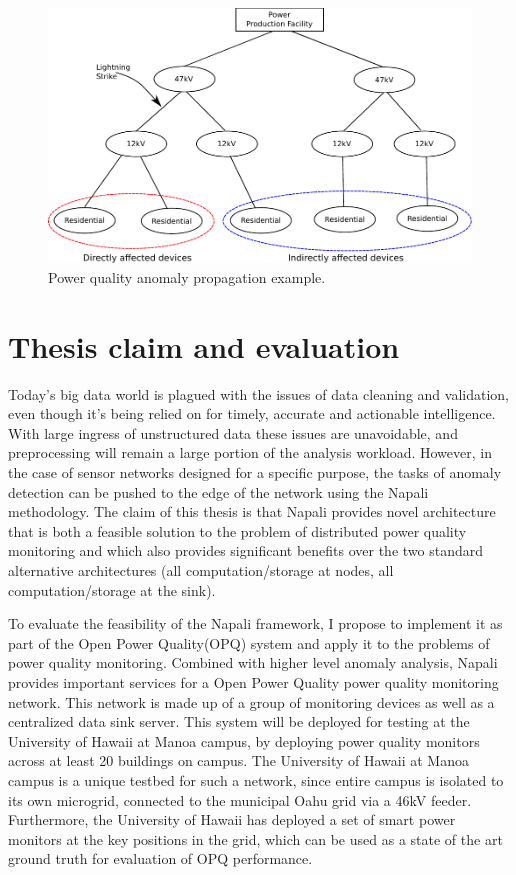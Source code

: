 \begin{figure}[h]
	\centering
	  \includegraphics[width=0.9\linewidth]{img/grid_hierarchy_cartoon.pdf}
	  \caption{Power quality anomaly propagation example.}
	  \label{intro:fig2}
\end{figure}

\section{Thesis claim and evaluation} \label{intro:sec:claim}

Today's big data world is plagued with the issues of data cleaning and validation, even though it's being relied on for timely, accurate and actionable intelligence. With large ingress of unstructured data these issues are unavoidable, and preprocessing will remain a large portion of the analysis workload. However, in the case of sensor networks designed for a specific purpose, the tasks of anomaly detection can be pushed to the edge of the network using the Napali methodology. The claim of this thesis is that Napali provides novel architecture that is both a feasible solution to the problem of distributed power quality monitoring and which also provides significant benefits over the two standard alternative architectures (all computation/storage at nodes, all computation/storage at the sink).

To evaluate the feasibility of the Napali framework, I propose to implement it as part of the Open Power Quality(OPQ) system and apply it to the problems of power quality monitoring. Combined with higher level anomaly analysis, Napali provides important services for a Open Power Quality power quality monitoring network. This network is made up of a group of monitoring devices as well as a centralized data sink server. This system will be deployed for testing at the University of Hawaii at Manoa campus, by deploying power quality monitors across at least 20 buildings on campus. The University of Hawaii at Manoa campus is a unique testbed for such a network, since entire campus is isolated to its own microgrid, connected to the municipal Oahu grid via a 46kV feeder. Furthermore, the University of Hawaii has deployed a set of smart power monitors at the key positions in the grid, which can be used as a state of the art ground truth for evaluation of OPQ performance. 

